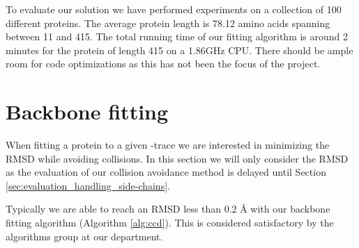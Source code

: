 To evaluate our solution we have performed experiments on a collection of 100 different proteins.
The average protein length is 78.12 amino acids spanning between 11 and 415.
The total running time of our fitting algorithm is around 2 minutes for the protein of length 415 on a 1.86GHz CPU.
There should be ample room for code optimizations as this has not been the focus of the project.

\section{Backbone fitting}
When fitting a protein to a given \Ca-trace we are interested in minimizing the RMSD while avoiding collisions.
In this section we will only consider the RMSD as the evaluation of our collision avoidance method  is delayed until Section \ref{sec:evaluation_handling_side-chains}. 

Typically we are able to reach an RMSD less than 0.2 Å with our backbone fitting algorithm (Algorithm \ref{alg:ccd}).
This is considered satisfactory by the algorithms group at our department.

